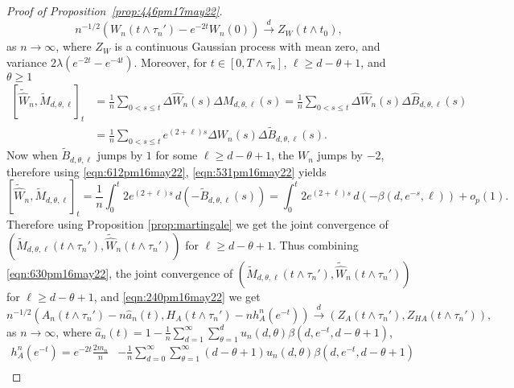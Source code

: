 \documentclass[11pt]{article}
\def\tod{\stackrel{d}{\longrightarrow}}
\def\tod{\stackrel{d}{\longrightarrow}}
\begin{document}
\begin{proof}[Proof of Proposition~\ref{prop:446pm17may22}]
\begin{equation}
\label{eqn:630pm16may22}
    n^{-1/2}\left({W}_n(t\wedge \tau_n')-e^{-2t}{W}_n(0)\right) \tod {Z}_W(t\wedge t_0),
\end{equation}
as $n\to \infty$, where $Z_W$ is a continuous Gaussian process with mean zero, and variance $2\lambda(e^{-2t}-e^{-4t})$. Moreover, for $t\in [0, T\wedge \tau_n]$, $\ell \geq d-\theta+1$, and $\theta\geq 1$
\begin{equation}\label{eqn:531pm16may22}
\begin{aligned}
     \left[\widetilde{\widehat{W}}_n, \widetilde{M}_{d,\theta,\ell}\right]_t &=\frac{1}{n}\sum_{0<s\leq t}{ \Delta \widehat{W}_n(s)\Delta {M}_{d,\theta,\ell}(s)} = \frac{1}{n}\sum_{0<s\leq t} \Delta \widehat{W}_n(s)\Delta \widehat{B}_{d,\theta,\ell}(s) \\
    & = \frac{1}{n}\sum_{0<s\leq t} e^{(2+\ell)s} \Delta W_n(s)\Delta \widetilde{B}_{d,\theta,\ell}(s).
\end{aligned}     
\end{equation}
Now when $\widetilde{B}_{d,\theta,\ell}$ jumps by $1$ for some $\ell \geq d-\theta+1$, the $W_n$ jumps by $-2$, therefore using \eqref{eqn:612pm16may22}, \eqref{eqn:531pm16may22} yields
\begin{equation}
    \left[\widetilde{\widehat{W}}_n, \widetilde{M}_{d,\theta,\ell}\right]_t = \frac{1}{n}\int_{0}^t2 e^{(2+\ell)s}  \,d (- \widetilde{B}_{d,\theta,\ell}(s)) = \int_{0}^t2 e^{(2+\ell)s}  \,d (-\beta(d,e^{-s},\ell)) +o_p(1).
\end{equation}
Therefore using Proposition \ref{prop:martingale} we get the joint convergence of $(\widetilde{M}_{d,\theta,\ell}(t\wedge \tau_n'),\widetilde{\widehat{W}}_n(t\wedge \tau_n'))$ for $\ell\geq d-\theta+1$. Thus combining \eqref{eqn:630pm16may22}, the joint convergence of $(\widetilde{M}_{d,\theta,\ell}(t\wedge \tau_n'),\widetilde{\widehat{W}}_n(t\wedge \tau_n'))$ for $\ell\geq d-\theta+1$, and \eqref{eqn:240pm16may22} we get   
\begin{equation}
    n^{-1/2}\left(A_n(t\wedge \tau_n')- n\widehat{a}_n(t),H_A(t\wedge \tau_n')- n h_A^n(e^{-t})\right) \tod (Z_A(t\wedge \tau_n'), Z_{HA}(t\wedge \tau_n') ), 
\end{equation}
as $n\to \infty$, where $\widehat{a}_n(t) = 1-\frac 1 n \sum_{d=1}^{\infty}\sum_{\theta=1}^{d} u_n(d,\theta) \beta(d,e^{-t},d-\theta+1)$,  
\begin{equation}
\label{eqn:912pm16may22}
\begin{aligned}
     h_A^n(e^{-t}) = e^{-2t}\frac{2m_n}{n}&-\frac 1 n \sum_{d=0}^{\infty}\sum_{\theta=1}^{\infty}(d-\theta+1)u_n(d,\theta) \beta(d,e^{-t},d-\theta+1)\\

\end{aligned}
\end{equation}
\end{proof}
\end{document}
